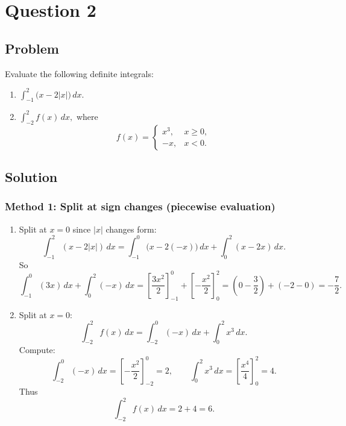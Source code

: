 \documentclass[12pt]{article}
\begin{document}
\bigskip


\newpage

\section*{Question 2}

\subsection*{Problem}

Evaluate the following definite integrals:
\begin{enumerate}[label=(\roman*)]
\item \(\displaystyle \int_{-1}^{2}\bigl(x-2|x|\bigr)\,dx.\)
\item \(\displaystyle \int_{-2}^{2} f(x)\,dx,\) where
\[
f(x)=
\begin{cases}
x^3, & x\ge 0,\\
-x, & x<0.
\end{cases}
\]
\end{enumerate}

\subsection*{Solution}

\subsubsection*{Method 1: Split at sign changes (piecewise evaluation)}

\begin{enumerate}[label=(\roman*)]
\item Split at \(x=0\) since \(|x|\) changes form:
\[
\int_{-1}^{2}(x-2|x|)\,dx
=\int_{-1}^{0}\bigl(x-2(-x)\bigr)\,dx+\int_{0}^{2}(x-2x)\,dx.
\]
So
\[
\int_{-1}^{0} (3x)\,dx+\int_{0}^{2}(-x)\,dx
=\left[\frac{3x^2}{2}\right]_{-1}^{0}+\left[-\frac{x^2}{2}\right]_{0}^{2}
= \left(0-\frac{3}{2}\right)+\left(-2-0\right)=-\frac{7}{2}.
\]

\item Split at \(x=0\):
\[
\int_{-2}^{2} f(x)\,dx=\int_{-2}^{0}(-x)\,dx+\int_{0}^{2}x^3\,dx.
\]
Compute:
\[
\int_{-2}^{0}(-x)\,dx=\left[-\frac{x^2}{2}\right]_{-2}^{0}=2,
\qquad
\int_{0}^{2}x^3\,dx=\left[\frac{x^4}{4}\right]_{0}^{2}=4.
\]
Thus
\[
\int_{-2}^{2} f(x)\,dx = 2+4=6.
\]
\end{enumerate}
\end{document}
